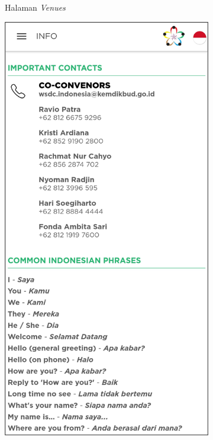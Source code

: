 \begin{figure}[H]
\begin{subfigure}[b]{0.21\textwidth}
	    \caption{Halaman {\it Venues}}
	    \label{fig:wsdcAppVenues}
     \end{subfigure}
     \hfill
     \begin{subfigure}[b]{0.247\textwidth}
    \centering
	    \includegraphics[scale=0.4]{Gambar/InfoPage.png}

\end{subfigure}
\end{figure}
